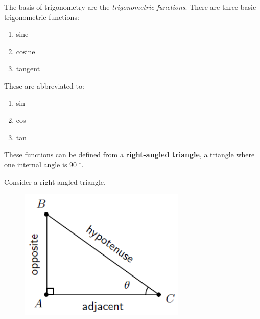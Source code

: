       
      \label{m39408*id79540}The basis of trigonometry are the \textsl{trigonometric functions}. There are three basic trigonometric functions:\par 
      \label{m39408*id79552}\begin{enumerate}[noitemsep, label=\textbf{\arabic*}. ] 
            \label{m39408*uid15}\item sine
\label{m39408*uid16}\item cosine
\label{m39408*uid17}\item tangent
\end{enumerate}
        
      \label{m39408*id79593}These are abbreviated to:\par 
      \label{m39408*id79596}\begin{enumerate}[noitemsep, label=\textbf{\arabic*}. ] 
            \label{m39408*uid18}\item sin
\label{m39408*uid19}\item cos
\label{m39408*uid20}\item tan
\end{enumerate}
        
      \label{m39408*id79636}These functions can be defined from a \textbf{right-angled triangle}, a triangle where one internal angle is 90 \begin{math}{}^{\circ }\end{math}.\par 
      \label{m39408*id79660}Consider a right-angled triangle.\par 
      \label{m39408*id79664}
        
    \setcounter{subfigure}{0}


	\begin{figure}[H] %
    \begin{center}
    \label{m39408*id79667!!!underscore!!!media}\label{m39408*id79667!!!underscore!!!printimage}\includegraphics[width=300px]{col11306.imgs/m39408_MG10C15_003.png} %
        
      \vspace{2pt}
    \vspace{.1in}
    
    \end{center}

 \end{figure}   

